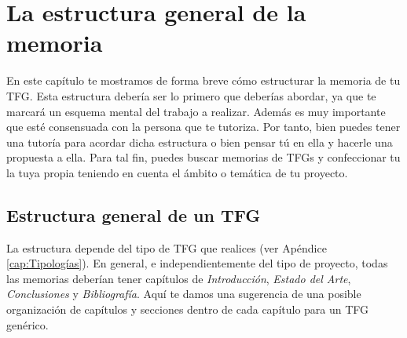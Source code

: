 \chapter{La estructura general de la memoria}
\label{cap:EstructuraMemoria}

En este capítulo te mostramos de forma breve cómo estructurar la memoria de tu TFG. Esta estructura debería ser lo primero que deberías abordar, ya que te marcará un esquema mental del trabajo a realizar. Además es muy importante que esté consensuada con la persona que te tutoriza. Por tanto, bien puedes tener una tutoría para acordar dicha estructura o bien pensar tú en ella y hacerle una propuesta a ella. Para tal fin, puedes buscar memorias de TFGs y confeccionar tu la tuya propia teniendo en cuenta el ámbito o temática de tu proyecto.

\section{Estructura general de un TFG}

La estructura depende del tipo de TFG que realices (ver Apéndice \ref{cap:Tipologías}). En general, e independientemente del tipo de proyecto, todas las memorias deberían tener capítulos de \textit{Introducción}, \textit{Estado del Arte}, \textit{Conclusiones} y \textit{Bibliografía}. Aquí te damos una sugerencia de una posible organización de capítulos y secciones dentro de cada capítulo para un TFG genérico. 

